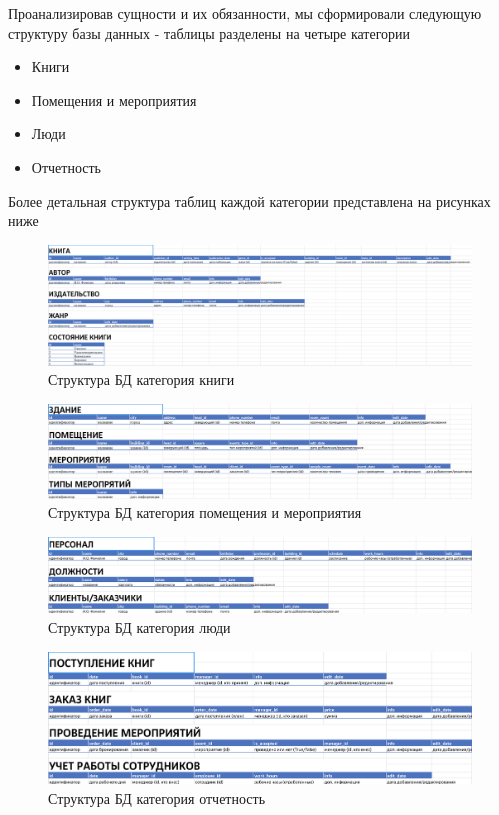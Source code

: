 \documentclass[14pt]{extreport}
\begin{document}
Проанализировав сущности и их обязанности, мы сформировали следующую структуру базы данных - таблицы разделены на четыре категории
\begin{itemize}
    \item Книги
    \item Помещения и мероприятия 
    \item Люди 
    \item Отчетность
\end{itemize}

Более детальная структура таблиц каждой категории представлена на рисунках ниже

\begin{figure}[h!]
\centering
\includegraphics[width=1\linewidth]{books.png}
\caption{Структура БД категория книги}
\end{figure}

\begin{figure}[h!]
\centering
\includegraphics[width=1\linewidth]{meetups.png}
\caption{Структура БД категория помещения и мероприятия}
\end{figure}

\begin{figure}[h!]
\centering
\includegraphics[width=1\linewidth]{people.png}
\caption{Структура БД категория люди}
\end{figure}

\begin{figure}[h!]
\centering
\includegraphics[width=1\linewidth]{taxes.png}
\caption{Структура БД категория отчетность}
\end{figure}

\conclusions

\begin{thebibliography}{2}

\end{thebibliography}
\end{document}
